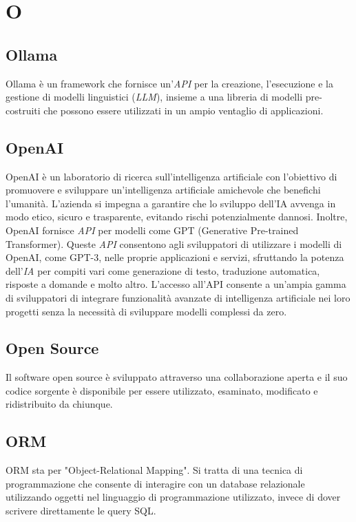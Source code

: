 \chapter{O}

\section{Ollama}
Ollama è un framework che fornisce un’\emph{API} per la creazione, l’esecuzione e la gestione di modelli linguistici (\emph{LLM}), insieme a una libreria di modelli pre-costruiti che possono essere utilizzati in un ampio ventaglio di applicazioni.

\section{OpenAI}
OpenAI è un laboratorio di ricerca sull'intelligenza artificiale con l'obiettivo di promuovere e sviluppare un'intelligenza artificiale amichevole che benefichi l'umanità. L'azienda si impegna a garantire che lo sviluppo dell'IA avvenga in modo etico, sicuro e trasparente, evitando rischi potenzialmente dannosi.
Inoltre, OpenAI fornisce \emph{API} per modelli come GPT (Generative Pre-trained Transformer). Queste \emph{API} consentono agli sviluppatori di utilizzare i modelli di OpenAI, come GPT-3, nelle proprie applicazioni e servizi, sfruttando la potenza dell'\emph{IA} per compiti vari come generazione di testo, traduzione automatica, risposte a domande e molto altro. L'accesso all'API consente a un'ampia gamma di sviluppatori di integrare funzionalità avanzate di intelligenza artificiale nei loro progetti senza la necessità di sviluppare modelli complessi da zero.

\section{Open Source}
Il software open source è sviluppato attraverso una collaborazione aperta e il suo codice sorgente è disponibile per essere utilizzato, esaminato, modificato e ridistribuito da chiunque. 

\section{ORM}
ORM sta per "Object-Relational Mapping". Si tratta di una tecnica di programmazione che consente di interagire con un database relazionale utilizzando oggetti nel linguaggio di programmazione utilizzato, invece di dover scrivere direttamente le query SQL.
